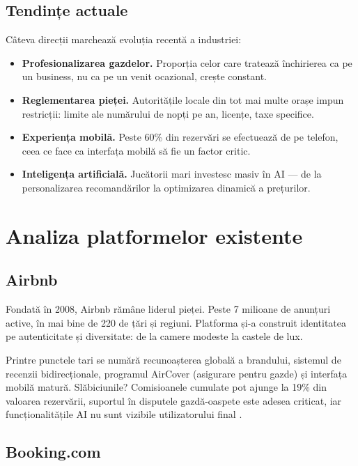 \documentclass[12pt,a4paper,oneside]{report}
\begin{document}
\subsection{Tendințe actuale}

Câteva direcții marchează evoluția recentă a industriei:

\begin{itemize}
  \item \textbf{Profesionalizarea gazdelor.} Proporția celor care tratează închirierea ca pe un business, nu ca pe un venit ocazional, crește constant.
  \item \textbf{Reglementarea pieței.} Autoritățile locale din tot mai multe orașe impun restricții: limite ale numărului de nopți pe an, licențe, taxe specifice.
  \item \textbf{Experiența mobilă.} Peste 60\% din rezervări se efectuează de pe telefon, ceea ce face ca interfața mobilă să fie un factor critic.
  \item \textbf{Inteligența artificială.} Jucătorii mari investesc masiv în AI — de la personalizarea recomandărilor la optimizarea dinamică a prețurilor.
\end{itemize}


\section{Analiza platformelor existente}

\subsection{Airbnb}

Fondată în 2008, Airbnb rămâne liderul pieței. Peste 7 milioane de anunțuri active, în mai bine de 220 de țări și regiuni. Platforma și-a construit identitatea pe autenticitate și diversitate: de la camere modeste la castele de lux.

Printre punctele tari se numără recunoașterea globală a brandului, sistemul de recenzii bidirecționale, programul AirCover (asigurare pentru gazde) și interfața mobilă matură. Slăbiciunile? Comisioanele cumulate pot ajunge la 19\% din valoarea rezervării, suportul în disputele gazdă-oaspete este adesea criticat, iar funcționalitățile AI nu sunt vizibile utilizatorului final \cite{airbnb}.

\subsection{Booking.com}
\end{document}
